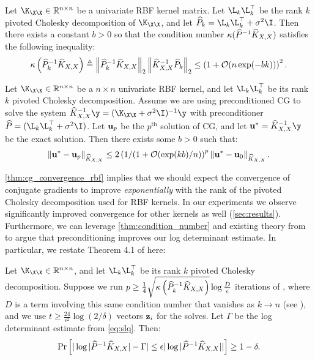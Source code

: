 \begin{lemma}
  \label{thm:condition_number}
  Let $\K_{\X\X} \in \reals^{n \times n}$ be a univariate RBF kernel matrix.
  Let $\L_{k} \L_k^\top$ be the rank $k$ pivoted Cholesky decomposition of $\K_{\X\X}$, and let $\trainP_{k} = \L_k \L_k^\top + \sigma^{2}\I$.
  Then there exists a constant $b>0$ so that the condition number $\kappa(\widehat{P}^{-1}\widehat{K}_{X,X})$ satisfies the following inequality:
  \begin{equation}
    \kappa \left( \trainP_{k}^{-1}\trainK \right)
    \triangleq \left\Vert \trainP_{k}^{-1}\trainK \right\Vert_{2} \left\Vert \trainK^{-1}\trainP_{k} \right\Vert_{2}
    \leq \left( 1 + \bigo{n\exp(-bk)} \right)^2.
  \end{equation}
\end{lemma}
\begin{theorem}
  \label{thm:cg_convergence_rbf}
  Let $\K_{\X\X} \in \reals^{n \times n}$ be a $n \times n$ univariate RBF kernel, and let $\L_k \L_k^\top$ be its rank $k$ pivoted Cholesky decomposition.
  Assume we are using preconditioned CG to solve the system $\trainK^{-1} \y = (\K_{\X\X} + \sigma^2 \I)^{-1} \y$ with preconditioner $\trainP = (\L_k \L_k^\top + \sigma^2 \I)$.
  Let $\mathbf{u}_p$ be the $p^\textrm{th}$ solution of CG, and let $\bu^{*} = \trainK^{-1} \y$ be the exact solution.
  Then there exists some $b > 0$ such that:
  \begin{equation}
    \Vert \bu^{*} - \bu_{p} \Vert_{\trainK}
    \leq 2 \left(1/(1 + \bigo{\exp(kb)/n}\right)^{p} \left\Vert \bu^{*} - \bu_{0} \right\Vert_{\trainK}.
  \end{equation}
\end{theorem}
%
\autoref{thm:cg_convergence_rbf} implies that we should expect the convergence of conjugate gradients to improve \emph{exponentially} with the rank of the pivoted Cholesky decomposition used for RBF kernels. In our experiments we observe significantly improved convergence for other kernels as well (\autoref{sec:results}). Furthermore, we can leverage \autoref{thm:condition_number} and existing theory from \cite{ubaru2017fast} to argue that preconditioning improves our log determinant estimate. In particular, we restate Theorem 4.1 of \citet{ubaru2017fast} here:
\begin{theorem}
  \label{thm:slq_convergence}
  Let $\K_{\X\X} \in \reals^{n \times n}$, and let $\L_k \L_k^\top$ be its rank $k$ pivoted Cholesky decomposition. Suppose we run $p \geq \frac{1}{4} \sqrt{ \kappa \left( \widehat{P}_{k}^{-1}\widehat{K}_{X,X} \right) } \log \frac{D}{\epsilon}$ iterations of \mcgacro{}, where $D$ is a term involving this same condition number that vanishes as $k \to n$ (see \cite{ubaru2017fast}), and we use $t \geq \frac{24}{\epsilon^{2}}\log(2/\delta)$ vectors $\mathbf{z}_{i}$ for the solves. Let $\Gamma$ be the log determinant estimate from \eqref{eq:slq}. Then:
  \begin{equation}
    \textrm{Pr}\left[\vert \log \vert \widehat{P}^{-1}\widehat{K}_{X,X} \vert - \Gamma \vert \leq \epsilon\vert \log \vert \widehat{P}^{-1}\widehat{K}_{X,X} \vert \vert \right] \geq 1 - \delta.
  \end{equation}
\end{theorem}
